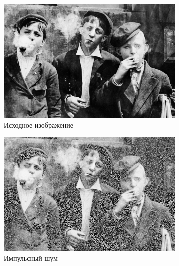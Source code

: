   \begin{figure}[ht] 
    \centering
    \begin{subfigure}[b]{0.5\linewidth}
        \centering
        \includegraphics[width=0.95\linewidth]{../lewis-hine-taschen-main-3.jpg} 
        \caption{Исходное изображение} 
        \label{contraharmonic_0.85:a} 
        \vspace{4ex}
    \end{subfigure}%
    \begin{subfigure}[b]{0.5\linewidth}
      \centering
      \includegraphics[width=0.95\linewidth]{../Contraharmonic_Filter/Contraharmonic_Impulse_noise_(m,n=(3,_3),q=0.85).jpg} 
      \caption{Импульсный шум} 
      \label{contraharmonic_0.85:b} 
      \vspace{4ex}
    \end{subfigure}
    \begin{subfigure}[b]{0.5\linewidth}
      \centering

\end{subfigure}
\end{figure}
